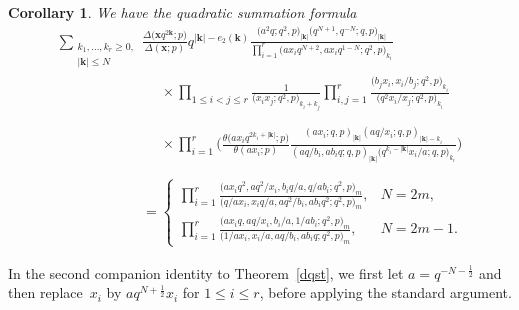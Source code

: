 \documentclass[pdftex]{sigma}%
\numberwithin{equation}{section}
\newtheorem{Corollary}[Theorem]{Corollary}
\def\ta{\theta}
\newcommand\bk{\mathbf k}
\newcommand\bx{\mathbf x}
\begin{document}
\begin{Corollary}\label{dqsc1}
We have the quadratic summation formula
\begin{gather*}
\sum_{\substack{k_1,\dots,k_r\ge 0,\\ |\bk|\le N}}
\frac{\Delta\big(\bx q^{2\bk};p\big)}{\Delta(\bx;p)}
q^{|\bk|-e_2(\bk)}
\frac{\big(a^2q;q^2,p\big)_{|\bk|} \big(q^{N+1},q^{-N};q,p\big)_{|\bk|}}
{\prod\limits_{i=1}^{r}\big(ax_iq^{N+2},ax_iq^{1-N};q^2,p\big)_{k_i}}
\\ \phantom{\sum_{\substack{k_1,\dots,k_r\ge 0,\\ |\bk|\le N}}=}{}
\times\prod\limits_{1\le i<j\le r}\frac 1{\big(x_ix_j;q^2,p\big) _{k_i+k_j}}
\prod\limits_{i,j=1}^{r}\frac{\big(b_jx_i,x_i/b_j;q^2,p\big)_{k_i}}
{\big(q^2x_i/x_j;q^2,p\big)_{k_i}}
\\ \phantom{\sum_{\substack{k_1,\dots,k_r\ge 0,\\ |\bk|\le N}}=}{}
\times\prod\limits_{i=1}^{r}\bigg(\frac{\ta\big(ax_iq^{2k_i+|\bk|};p\big)}{\ta(ax_i;p)}
\frac {(ax_i;q,p)_{|\bk|}
(aq/x_i;q,p)_{|\bk|-k_i}}
{(aq/b_i,ab_iq;q,p)_{|\bk|}\big(q^{k_i-|\bk|}x_i/a;q,p\big)_{k_i}}\bigg)
\\ \phantom{\sum_{\substack{k_1,\dots,k_r\ge 0,\\ |\bk|\le N}}}{}
=\begin{cases}
\displaystyle\prod\limits_{i=1}^{r}\frac
{\big(ax_iq^2,aq^2/x_i,b_iq/a,q/ab_i;q^2,p\big)_m}
{\big(q/ax_i,x_iq/a,aq^2/b_i,ab_iq^2;q^2,p\big)_m},&N=2m,
\\[2.5ex]
\displaystyle\prod\limits_{i=1}^{r}\frac
{\big(ax_iq,aq/x_i,b_i/a,1/ab_i;q^2,p\big)_m}
{\big(1/ax_i,x_i/a,aq/b_i,ab_iq;q^2,p\big)_m},&N=2m-1.
\end{cases}
\end{gather*}
\end{Corollary}

In the second companion identity to Theorem~\ref{dqst}, we first let $a=q^{-N-\frac 12}$ and then replace~$x_i$ by $aq^{N+\frac 12}x_i$ for $1\leq i\leq r$, before applying the standard argument.
\end{document}
